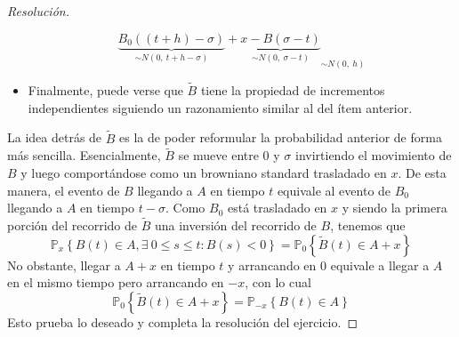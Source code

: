 \documentclass[a4paper,11pt]{article}
\newcommand{\Probx}[2]{\ensuremath{\mathbb{P}_{#1} \left\{ #2 \right\}}}
\begin{document}
\begin{proof}[Resoluci\'on]
\begin{itemize}
$${            \underbrace{B_0((t+h) - \sigma)}_{\sim N(0,~t+h-\sigma)} 
            + \underbrace{x - B(\sigma - t)}_{\sim N(0,~\sigma - t)}}_{\sim N(0,~h)}$$
    \item Finalmente, puede verse que $\tilde{B}$ tiene la propiedad de incrementos independientes siguiendo
    un razonamiento similar al del ítem anterior.
\end{itemize}
La idea detrás de $\tilde{B}$ es la de poder reformular la probabilidad anterior de forma más sencilla. 
Esencialmente, $\tilde{B}$ se mueve entre $0$ y $\sigma$ invirtiendo el movimiento de $B$ y luego
comportándose como un browniano standard trasladado en $x$. De esta manera, el evento de $B$ llegando a $A$
en tiempo $t$ equivale al evento de $B_0$ llegando a $A$ en tiempo $t - \sigma$. Como $B_0$ está
trasladado en $x$ y siendo la primera porción del recorrido de $\tilde{B}$ una inversión del recorrido
de $B$, tenemos que
$$\Probx{x}{B(t) \in A, \exists~0 \leq s \leq t : B(s) < 0} = \Probx{0}{\tilde{B}(t) \in A + x}$$
No obstante, llegar a $A+x$ en tiempo $t$ y arrancando en $0$ equivale a llegar a $A$ en el mismo tiempo
pero arrancando en $-x$, con lo cual
$$\Probx{0}{\tilde{B}(t) \in A + x} = \Probx{-x}{B(t) \in A}$$
Esto prueba lo deseado y completa la resolución del ejercicio.

\end{proof}
\end{document}

